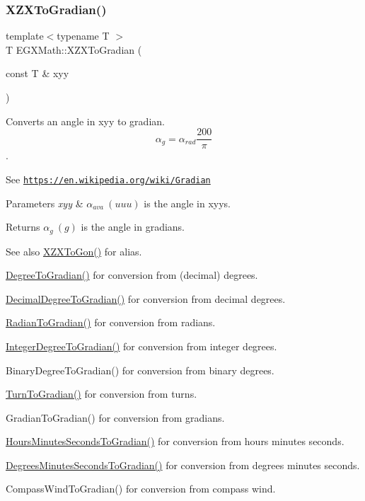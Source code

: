 \subsubsection{\texorpdfstring{X\+Z\+X\+To\+Gradian()}{XZXToGradian()}}
{\footnotesize\ttfamily template$<$typename T $>$ \\
T E\+G\+X\+Math\+::\+X\+Z\+X\+To\+Gradian (\begin{DoxyParamCaption}\item[{const T \&}]{xyy }\end{DoxyParamCaption})}



Converts an angle in xyy to gradian. \[\alpha_{g}=\alpha_{rad}\frac{200}{\pi}\]. 

See \href{https://en.wikipedia.org/wiki/Gradian}{\tt https\+://en.\+wikipedia.\+org/wiki/\+Gradian} 
\begin{DoxyParams}{Parameters}
{\em xyy} & $\alpha_{ava}\ (uuu)$ is the angle in xyys. \\
\hline
\end{DoxyParams}
\begin{DoxyReturn}{Returns}
$\alpha_{g}\ (g)$ is the angle in gradians. 
\end{DoxyReturn}
\begin{DoxySeeAlso}{See also}
\mbox{\hyperlink{group___e_g_x_math-_angle_conversions-_x_z_x_ga5b73732dd6ff688b3aa07629fc9acb44}{X\+Z\+X\+To\+Gon()}} for alias. 

\mbox{\hyperlink{group___e_g_x_math-_angle_conversions-_degree_ga25bb5506b3f66fff7a1b85bf7bd795b3}{Degree\+To\+Gradian()}} for conversion from (decimal) degrees. 

\mbox{\hyperlink{group___e_g_x_math-_angle_conversions-_decimal_degree_ga3ac6f1ceb36a4938cdf3b55554734c99}{Decimal\+Degree\+To\+Gradian()}} for conversion from decimal degrees. 

\mbox{\hyperlink{group___e_g_x_math-_angle_conversions-_radian_ga3c1607eae50cbf0186c42485bb3878d5}{Radian\+To\+Gradian()}} for conversion from radians. 

\mbox{\hyperlink{group___e_g_x_math-_angle_conversions-_integer_degree_ga47127467ff7a8ef57f6be9ce496a97df}{Integer\+Degree\+To\+Gradian()}} for conversion from integer degrees. 

Binary\+Degree\+To\+Gradian() for conversion from binary degrees. 

\mbox{\hyperlink{group___e_g_x_math-_angle_conversions-_turn_gad6aa9bdde2cde17cec136b24ee017bba}{Turn\+To\+Gradian()}} for conversion from turns. 

Gradian\+To\+Gradian() for conversion from gradians. 

\mbox{\hyperlink{group___e_g_x_math-_angle_conversions-_hours_minutes_seconds_ga1731e750f3e5561313ee9d22adff747e}{Hours\+Minutes\+Seconds\+To\+Gradian()}} for conversion from hours minutes seconds. 

\mbox{\hyperlink{group___e_g_x_math-_angle_conversions-_degrees_minutes_seconds_ga59e2c2b178f760c337fcb3ea7406570f}{Degrees\+Minutes\+Seconds\+To\+Gradian()}} for conversion from degrees minutes seconds. 

Compass\+Wind\+To\+Gradian() for conversion from compass wind. 
\end{DoxySeeAlso}
